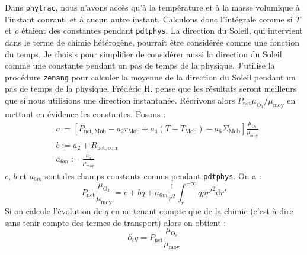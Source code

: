 \documentclass[a4paper,english,french]{article}
\newcommand{\ud}{\mathrm{d}}
\begin{document}
Dans \verb+phytrac+, nous n'avons accès qu'à la température et à la
masse volumique à l'instant courant, et à aucun autre instant.
Calculons donc l'intégrale comme si $T$ et $\rho$ étaient des
constantes pendant \verb+pdtphys+. La direction du Soleil, qui
intervient dans le terme de chimie hétérogène, pourrait être
considérée comme une fonction du temps. Je choisis pour simplifier de
considérer aussi la direction du Soleil comme une constante pendant un
pas de temps de la physique. J'utilise la procédure \verb+zenang+ pour
calculer la moyenne de la direction du Soleil pendant un pas de temps
de la physique. Frédéric H. pense que les résultats seront meilleurs que
si nous utilisions une direction instantanée. Récrivons alors
$P_\mathrm{net} \mu_{\mathrm{O}_3} / \mu_\mathrm{moy}$ en mettant en
évidence les constantes. Posons :
\begin{align*}
  & c := [P_\mathrm{net,Mob} - a_2 r_\mathrm{Mob}
  + a_4 (T - T_\mathrm{Mob}) - a_6 \Sigma_\mathrm{Mob}]
  \frac{\mu_{\mathrm{O}_3}}{\mu_\mathrm{moy}} \\
  & b := a_2 + R_\mathrm{het,corr} \\
  & a_{6m} := \frac{a_6}{\mu_\mathrm{moy}}
\end{align*}
$c$, $b$ et $a_{6m}$ sont des champs constants connus pendant
\verb+pdtphys+. On a :
\begin{equation}
  \label{eq:dq_dt}
  P_\mathrm{net} \frac{\mu_{\mathrm{O}_3}}{\mu_\mathrm{moy}}
  = c + b q + a_{6m} \frac{1}{r^2} \int_r ^{+ \infty} q \rho r'^2 \ud r'
\end{equation}
Si on calcule l'évolution de $q$ en ne tenant compte
que de la chimie (c'est-à-dire sans tenir compte des termes de
transport) alors on obtient :
\begin{displaymath}
  \partial_t q = P_\mathrm{net} \frac{\mu_{\mathrm{O}_3}}{\mu_\mathrm{moy}}
\end{displaymath}
\end{document}
